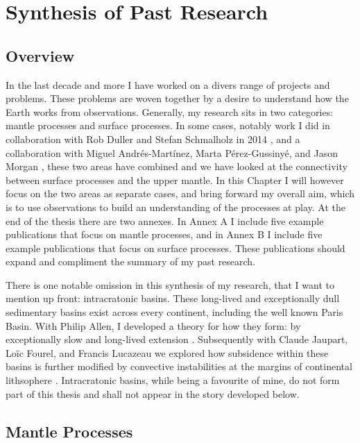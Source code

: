 \chapter{Synthesis of Past Research}

\section{Overview}

In the last decade and more I have worked on a divers range of projects and problems. These problems are woven together by a desire to understand how the Earth works from observations. Generally, my research sits in two categories: mantle processes and surface processes. In some cases, notably work I did in collaboration with Rob Duller and Stefan Schmalholz in 2014 \citep{armitage-etal-2014}, and a collaboration with Miguel Andrés-Mart\'inez, Marta Pérez-Gussinyé, and Jason Morgan \citep{andres-martinez-etal-2019}, these two areas have combined and we have looked at the connectivity between surface processes and the upper mantle. In this Chapter I will however focus on the two areas as separate cases, and bring forward my overall aim, which is to use observations to build an understanding of the processes at play. At the end of the thesis there are two annexes. In Annex A I include five example publications that focus on mantle processes, and in Annex B I include five example publications that focus on surface processes. These publications should expand and compliment the summary of my past research.

There is one notable omission in this synthesis of my research, that I want to mention up front: intracratonic basins. These long-lived and exceptionally dull sedimentary basins exist across every continent, including the well known Paris Basin. With Philip Allen, I developed a theory for how they form: by exceptionally slow and long-lived extension \citep{armitage-2010,allen-2012}. Subsequently with Claude Jaupart, Loïc Fourel, and Francis Lucazeau we explored how subsidence within these basins is further modified by convective instabilities at the margins of continental lithsophere \citep{armitage-etal-jgr-2013,lucazeau-etal-2015}. Intracratonic basins, while being a favourite of mine, do not form part of this thesis and shall not appear in the story developed below.

\section{Mantle Processes}

